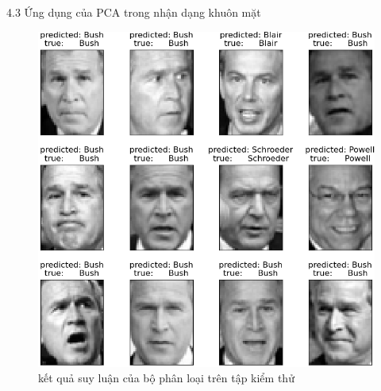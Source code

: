 \documentclass[notheorems,envcountsect,hyperref=unicode]{beamer}
\begin{document}
\begin{frame}{4.3 Ứng dụng của PCA trong nhận dạng khuôn mặt}
\begin{figure}[htp]
	\centering
	\includegraphics[scale=0.35]{predict_pca.png}
	\caption{kết quả suy luận của bộ phân loại trên tập kiểm thử}
	\label{fig:output}
\end{figure}
\end{frame}
\end{document}
